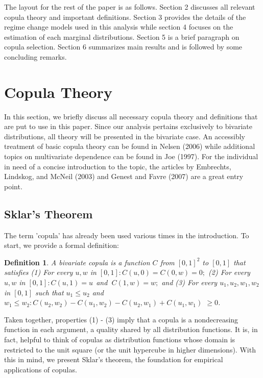 \documentclass[12pt]{article}
\newtheorem{defn}{Definition}
\begin{document}
The layout for the rest of the paper is as follows. Section 2 discusses
all relevant copula theory and important definitions. Section 3 provides
the details of the regime change models used in this analysis while section
4 focuses on the estimation of each marginal distributions. Section 5 is
a brief paragraph on copula selection. Section 6 summarizes main results
and is followed by some concluding remarks.

\section{Copula Theory}

In this section, we briefly discuss all necessary copula theory and definitions
that are put to use in this paper. Since our analysis pertains exclusively
to bivariate distributions, all theory will be presented in the bivariate
case. An accessibly treatment of basic copula theory can be found in
Nelsen (2006) while additional topics on multivariate dependence can be
found in Joe (1997). For the individual in need of a concise introduction
to the topic, the articles by Embrechts, Lindskog, and McNeil (2003) and
Genest and Favre (2007) are a great entry point.

\subsection{Sklar's Theorem}

The term 'copula' has already been used various times in the introduction.
To start, we provide a formal definition:

\begin{defn}\label{defn:copula}
A bivariate copula is a function $C$ from $\left[0,1\right]^{2}$ to $\left[0,1\right]$ that satisfies (1) For every $u,w$ in $\left[0,1\right] :C\left(u,0\right) = C\left(0,w\right) = 0;$ (2) For every $u,w$ in $\left[0,1\right] :C\left(u,1\right) = u\ \ $and $\ C\left(1,w\right) = w;$ and (3) For every $u_{1}, u_{2}, w_{1}, w_{2}$ in $\left[0,1\right]$ such that $u_{1} \leq u_{2}$ and $w_{1} \leq w_{2}:C\left(u_{2}, w_{2}\right) - C\left(u_{1}, w_{2}\right) - C\left(u_{2}, w_{1}\right) + C\left(u_{1}, w_{1}\right)$ $\geq 0$.
\end{defn}

Taken together, properties (1) - (3) imply that a copula is a nondecreasing
function in each argument, a quality shared by all distribution functions.
It is, in fact, helpful to think of copulas as distribution functions whose
domain is restricted to the unit square (or the unit hypercube in higher
dimensions). With this in mind, we present Sklar's theorem, the foundation
for empirical applications of copulas.
\end{document}
